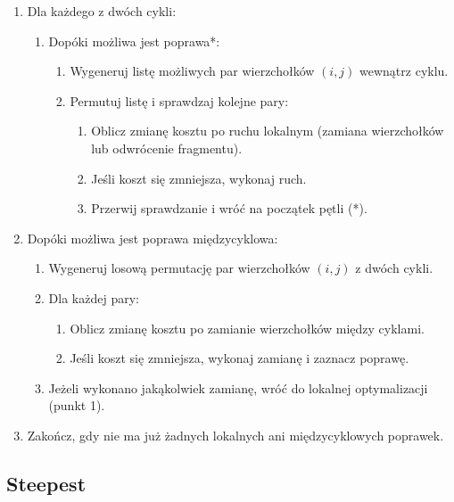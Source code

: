 \documentclass[11pt]{article}
\begin{document}
\begin{enumerate}
    \item Dla każdego z dwóch cykli:
    \begin{enumerate}
        \item Dopóki możliwa jest poprawa*:
        \begin{enumerate}
            \item Wygeneruj listę możliwych par wierzchołków $(i, j)$ wewnątrz cyklu.
            \item Permutuj listę i sprawdzaj kolejne pary:
            \begin{enumerate}
                \item Oblicz zmianę kosztu po ruchu lokalnym (zamiana wierzchołków lub odwrócenie fragmentu).
                \item Jeśli koszt się zmniejsza, wykonaj ruch.
                \item Przerwij sprawdzanie i wróć na początek pętli (*).
            \end{enumerate}
        \end{enumerate}
    \end{enumerate}

    \item Dopóki możliwa jest poprawa międzycyklowa:
    \begin{enumerate}
        \item Wygeneruj losową permutację par wierzchołków $(i, j)$ z dwóch cykli.
        \item Dla każdej pary:
        \begin{enumerate}
            \item Oblicz zmianę kosztu po zamianie wierzchołków między cyklami.
            \item Jeśli koszt się zmniejsza, wykonaj zamianę i zaznacz poprawę.
        \end{enumerate}
        \item Jeżeli wykonano jakąkolwiek zamianę, wróć do lokalnej optymalizacji (punkt 1).
    \end{enumerate}

    \item Zakończ, gdy nie ma już żadnych lokalnych ani międzycyklowych poprawek.
\end{enumerate}


\subsection{Steepest}\label{subsec:steepest}
\end{document}
